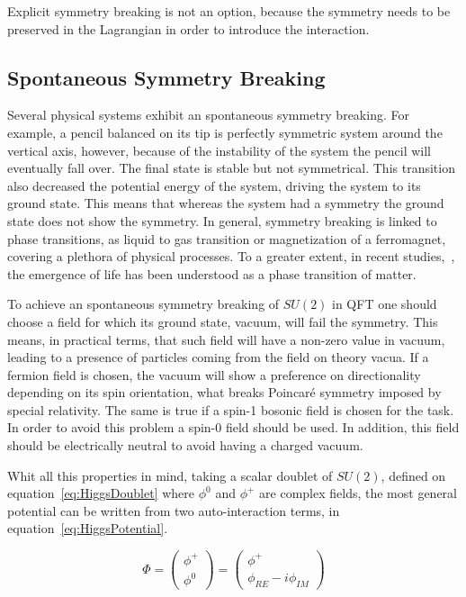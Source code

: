Explicit symmetry breaking is not an option, because the symmetry needs to be preserved in the Lagrangian in order to introduce the interaction.

\subsection{Spontaneous Symmetry Breaking}
\label{sec:SSB}

Several physical systems exhibit an spontaneous symmetry breaking. For example, a pencil balanced on its tip is perfectly symmetric system around the vertical axis, however, because of the instability of the system the pencil will eventually fall over. The final state is stable but not symmetrical. This transition also decreased the potential energy of the system, driving the system to its ground state. This means that whereas the system had a symmetry the ground state does not show the symmetry. In general, symmetry breaking is linked to phase transitions, as liquid to gas transition or magnetization of a ferromagnet, covering a plethora of physical processes. To a greater extent, in recent studies,~\cite{2015arXiv150302776M}, the emergence of life has been understood as a phase transition of matter. 

To achieve an spontaneous symmetry breaking of $SU(2)$ in QFT one should choose a field for which its ground state, vacuum, will fail the symmetry. This means, in practical terms, that such field will have a non-zero value in vacuum, leading to a presence of particles coming from the field on theory vacua. If a fermion field is chosen, the vacuum will show a preference on directionality depending on its spin orientation, what breaks Poincar\'{e} symmetry imposed by special relativity. The same is true if a spin-1 bosonic field is chosen for the task. In order to avoid this problem a spin-0 field should be used. In addition, this field should be electrically neutral to avoid having a charged vacuum.

Whit all this properties in mind, taking a scalar doublet of $SU(2)$, defined on equation~\ref{eq:HiggsDoublet} where $\phi^{0}$ and $\phi^{+}$ are complex fields, the most general potential can be written from two auto-interaction terms, in equation~\ref{eq:HiggsPotential}.

\begin{equation}
  \label{eq:HiggsDoublet}
  \Phi=\left(
    \begin{array}{c}
      \phi^{+} \\
      \phi^{0}
    \end{array}
  \right)=\left(
    \begin{array}{c}
      \phi^{+} \\
      \phi_{RE}-i\phi_{IM}
    \end{array}
  \right)
\end{equation}

